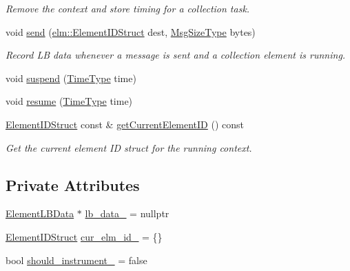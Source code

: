 \begin{DoxyCompactItemize}
\begin{DoxyCompactList}\small\item\em Remove the context and store timing for a collection task. \end{DoxyCompactList}\item 
void \hyperlink{structvt_1_1ctx_1_1_l_b_data_a9db5527f7fa49548e4a856ea1caff73a}{send} (\hyperlink{structvt_1_1elm_1_1_element_i_d_struct}{elm\+::\+Element\+I\+D\+Struct} dest, \hyperlink{namespacevt_a408e86a8c7c89309b52907dc5a513924}{Msg\+Size\+Type} bytes)
\begin{DoxyCompactList}\small\item\em Record LB data whenever a message is sent and a collection element is running. \end{DoxyCompactList}\item 
void \hyperlink{structvt_1_1ctx_1_1_l_b_data_accc285604c55529bfbd04ad244a5722e}{suspend} (\hyperlink{namespacevt_a876a9d0cd5a952859c72de8a46881442}{Time\+Type} time)
\item 
void \hyperlink{structvt_1_1ctx_1_1_l_b_data_ae398bd79d3e4fc5b865097306e696ac2}{resume} (\hyperlink{namespacevt_a876a9d0cd5a952859c72de8a46881442}{Time\+Type} time)
\item 
\hyperlink{structvt_1_1ctx_1_1_l_b_data_aad9fac05c3faf80173b273d900db6fb1}{Element\+I\+D\+Struct} const  \& \hyperlink{structvt_1_1ctx_1_1_l_b_data_ac2f63d7854e0c1d4c1c2b9ddf200f8c6}{get\+Current\+Element\+ID} () const
\begin{DoxyCompactList}\small\item\em Get the current element ID struct for the running context. \end{DoxyCompactList}\end{DoxyCompactItemize}
\subsection*{Private Attributes}
\begin{DoxyCompactItemize}
\item 
\hyperlink{structvt_1_1ctx_1_1_l_b_data_a11f1aeb75c01ae0c77d96f94ce1994bb}{Element\+L\+B\+Data} $\ast$ \hyperlink{structvt_1_1ctx_1_1_l_b_data_a766b2b0aa69889fc3e397c7bfbb0b68a}{lb\+\_\+data\+\_\+} = nullptr
\item 
\hyperlink{structvt_1_1ctx_1_1_l_b_data_aad9fac05c3faf80173b273d900db6fb1}{Element\+I\+D\+Struct} \hyperlink{structvt_1_1ctx_1_1_l_b_data_a8d84887a884c7f5783d4ccd7e5effd92}{cur\+\_\+elm\+\_\+id\+\_\+} = \{\}
\item 
bool \hyperlink{structvt_1_1ctx_1_1_l_b_data_a0f36387b1ed5d20e39b72e97251e0efc}{should\+\_\+instrument\+\_\+} = false
\end{DoxyCompactItemize}


